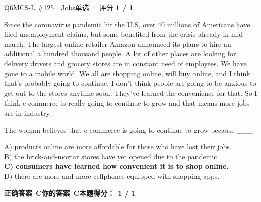 \begin{qblock}{Q6\quad MCS-L \#125\ \ Jobs}{单选 · 评分 \textcolor{cAccent}{\bfseries 1 / 1}}
\begin{promptbox}
Since the coronavirus pandemic hit the U.S, over 40 millions of Americans have filed unemployment claims, but some benefited from the crisis already in mid-march. The largest online retailer Amazon announced its plans to hire an additional a hundred thousand people. A lot of other places are looking for delivery drivers and grocery stores are in constant need of employees. We have gone to a mobile world. We all are shopping online, will buy online, and I think that's probably going to continue. I don't think people are going to be anxious to get out to the stores anytime soon. They've learned the convenience for that. So I think e-commerce is really going to continue to grow and that means more jobs are in industry.
\end{promptbox}
\begin{notebox}The woman believes that e-commerce is going to continue to grow because \_\_\_\end{notebox}
{\small
A) products online are more affordable for those who have lost their jobs.\\
B) the brick-and-mortar stores have yet opened due to the pandemic.\\
{\color{cFix}\textbf{C) consumers have learned how convenient it is to shop online.}}\\
D) there are more and more cellphones equipped with shopping apps.}
\par\smallskip
\textbf{正确答案}\ \textcolor{cFix}{\bfseries C}\qquad\textbf{你的答案}\ \textcolor{cFix}{\bfseries C}\qquad\textbf{本题得分：}\ {\color{cAccent}\bfseries 1 / 1}
\end{qblock}

